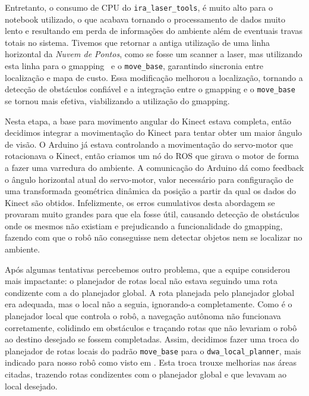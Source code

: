 Entretanto, o consumo de CPU do \verb|ira_laser_tools|, é muito alto para o notebook utilizado, o que acabava tornando o processamento de dados muito lento e resultando em perda de informações do ambiente além de eventuais travas totais no sistema. Tivemos que retornar a antiga utilização de uma linha horizontal da \textit{Nuvem de Pontos}, como se fosse um scanner a laser, mas utilizando esta linha para o gmapping \ e o \verb|move_base|, garantindo sincronia entre localização e mapa de custo. Essa modificação melhorou a localização, tornando a detecção de obstáculos confiável e a integração entre o gmapping e o \verb|move_base| se tornou mais efetiva, viabilizando a utilização do gmapping.

Nesta etapa, a base para movimento angular do Kinect estava completa, então decidimos integrar a movimentação do Kinect para tentar obter um maior ângulo de visão. O Arduino já estava controlando a movimentação do servo-motor que rotacionava o Kinect, então criamos um nó do ROS que girava o motor de forma a fazer uma varredura do ambiente. A comunicação do Arduino dá como feedback o ângulo horizontal atual do servo-motor, valor necessário para configuração de uma transformada geométrica dinâmica da posição a partir da qual os dados do Kinect são obtidos. Infelizmente, os erros cumulativos desta abordagem se provaram muito grandes para que ela fosse útil, causando detecção de obstáculos onde os mesmos não existiam e prejudicando a funcionalidade do gmapping, fazendo com que o robô não conseguisse nem detectar objetos nem se localizar no ambiente.

Após algumas tentativas percebemos outro problema, que a equipe considerou mais impactante: o planejador de rotas local não estava seguindo uma rota condizente com a do planejador global. A rota planejada pelo planejador global era adequada, mas o local não a seguia, ignorando-a completamente. Como é o planejador local que controla o robô, a navegação autônoma não funcionava corretamente, colidindo em obstáculos e traçando rotas que não levariam o robô ao destino desejado se fossem completadas. Assim, decidimos fazer uma troca do planejador de rotas locais do padrão \verb|move_base| para o \verb|dwa_local_planner|, mais indicado para nosso robô como visto em \cite{dwaLocalPlanner}. Esta troca trouxe melhorias nas áreas citadas, trazendo rotas condizentes com o planejador global e que levavam ao local desejado. 

